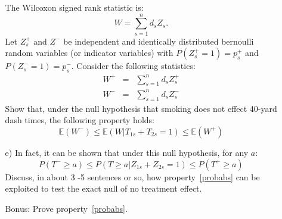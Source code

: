 \documentclass{article}
\newcommand{\E}[0]{\mathbb{E}}
\begin{document}
\begin{itemize}
\begin{itemize}
          The Wilcoxon signed rank statistic is:
          $$
            W = \sum_{s=1}^n d_sZ_s.
          $$
          Let $Z^+_s$ and $Z^-$ be independent and identically distributed 
          bernoulli random variables (or indicator variables) with $P(Z^+_s = 1) = p^+_s$
          and $P(Z^-_s = 1) = p^-_s$.
          Consider the following statistics:
          \begin{eqnarray*}
            W^+ &=& \sum_{s=1}^n d_s Z^+_s \\
            W^- & = & \sum_{s=1}^n d_sZ^-_s
          \end{eqnarray*}
          Show that, under the null hypothesis that smoking does not effect 40-yard dash times, 
          the following property holds:
          $$
           \E(W^-)\leq  \E(W| T_{1s} + T_{2s} =1) \leq \E(W^+) 
          $$
        \item[e)]
          In fact, it can be shown that under this null hypothesis, for any $a$:
          \begin{equation}
            P(T^- \geq a) \leq P(T \geq a | Z_{1s} + Z_{2s} = 1) \leq P(T^+ \geq a)
            \label{probabs}
          \end{equation}
          Discuss, in about 3 -5 sentences or so, how property~\eqref{probabs} can be
          exploited to test the exact null of no treatment effect. 
        \item[Bonus:]
          Prove property~\eqref{probabs}. 
      \end{itemize}
  \end{itemize}  
\end{document}
